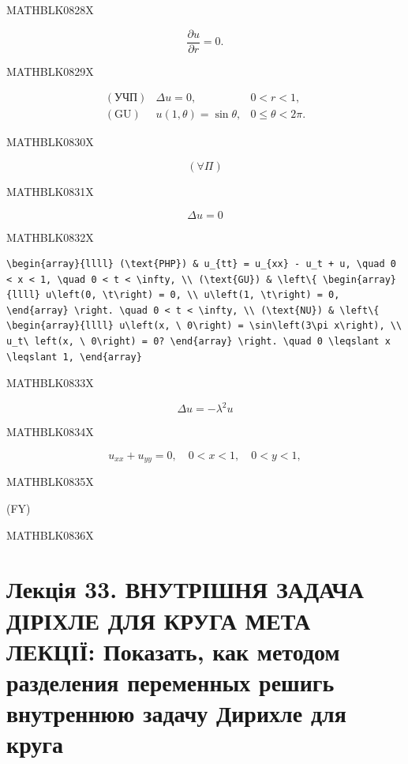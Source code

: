 \documentclass[
  ukrainian,
]{article}
\begin{document}
MATHBLK0828X

\[
\frac{\partial u}{\partial r} = 0.
\]

MATHBLK0829X

\[
\begin{array}{llll} (\text{УЧП}) & \Delta u = 0, & 0 < r < 1, \\ (\text{GU}) & u(1, \theta) = \sin \theta, & 0 \leqslant \theta < 2\pi. \end{array}
\]

MATHBLK0830X

\[
(\forall \Pi)
\]

MATHBLK0831X

\[
\Delta u = 0
\]

MATHBLK0832X

\begin{verbatim}
\begin{array}{llll} (\text{PHP}) & u_{tt} = u_{xx} - u_t + u, \quad 0 < x < 1, \quad 0 < t < \infty, \\ (\text{GU}) & \left\{ \begin{array}{llll} u\left(0, \t\right) = 0, \\ u\left(1, \t\right) = 0, \end{array} \right. \quad 0 < t < \infty, \\ (\text{NU}) & \left\{ \begin{array}{llll} u\left(x, \ 0\right) = \sin\left(3\pi x\right), \\ u_t\ left(x, \ 0\right) = 0? \end{array} \right. \quad 0 \leqslant x \leqslant 1, \end{array}
\end{verbatim}

MATHBLK0833X

\[
\Delta u = -\lambda^2 u
\]

MATHBLK0834X

\[
u_{xx} + u_{yy} = 0, \quad 0 < x < 1, \quad 0 < y < 1,
\]

MATHBLK0835X

(FY)

MATHBLK0836X

\section{Лекція 33. ВНУТРІШНЯ ЗАДАЧА ДІРІХЛЕ ДЛЯ КРУГА МЕТА ЛЕКЦІЇ:
Показать, как методом разделения переменных решигь внутреннюю задачу
Дирихле для
круга}\label{ux43bux435ux43aux446ux456ux44f-33.-ux432ux43dux443ux442ux440ux456ux448ux43dux44f-ux437ux430ux434ux430ux447ux430-ux434ux456ux440ux456ux445ux43bux435-ux434ux43bux44f-ux43aux440ux443ux433ux430-ux43cux435ux442ux430-ux43bux435ux43aux446ux456ux457-ux43fux43eux43aux430ux437ux430ux442ux44c-ux43aux430ux43a-ux43cux435ux442ux43eux434ux43eux43c-ux440ux430ux437ux434ux435ux43bux435ux43dux438ux44f-ux43fux435ux440ux435ux43cux435ux43dux43dux44bux445-ux440ux435ux448ux438ux433ux44c-ux432ux43dux443ux442ux440ux435ux43dux43dux44eux44e-ux437ux430ux434ux430ux447ux443-ux434ux438ux440ux438ux445ux43bux435-ux434ux43bux44f-ux43aux440ux443ux433ux430}
\end{document}
